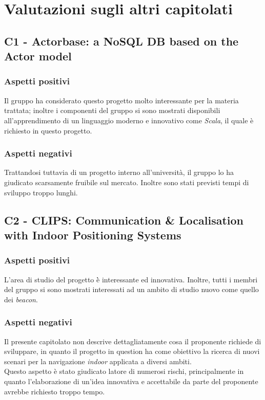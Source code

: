 \section{Valutazioni sugli altri capitolati}

\subsection{C1 - Actorbase: a NoSQL DB based on the Actor model}
\subsubsection{Aspetti positivi}
Il gruppo ha considerato questo progetto molto interessante per la materia trattata; inoltre
i componenti del gruppo si sono mostrati disponibili all'apprendimento di un linguaggio 
moderno e innovativo come \textit{Scala}, il quale \`e richiesto in questo progetto.
\subsubsection{Aspetti negativi}
Trattandosi tuttavia di un progetto interno all'universit\`a, il gruppo lo ha giudicato scarsamente
fruibile sul mercato. Inoltre sono stati previsti tempi di sviluppo troppo lunghi.


\subsection{C2 - CLIPS: Communication & Localisation with Indoor Positioning Systems}
\subsubsection{Aspetti positivi}
L'area di studio del progetto \`è interessante ed innovativa. Inoltre, tutti i membri
del gruppo si sono mostrati interessati ad un ambito di studio nuovo come quello dei
\textit{beacon}.
\subsubsection{Aspetti negativi}
Il presente capitolato non descrive dettagliatamente cosa il proponente richiede di sviluppare,
in quanto il progetto in question ha come obiettivo la ricerca di nuovi scenari per la navigazione \textit{indoor}
applicata a diversi ambiti.\\
Questo aspetto \`e stato giudicato latore di numerosi rischi, principalmente
in quanto l'elaborazione di un'idea innovativa e accettabile da parte del proponente avrebbe richiesto troppo tempo. 


